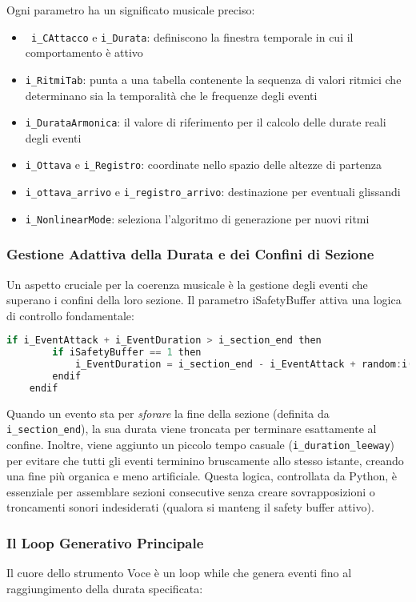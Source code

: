 Ogni parametro ha un significato musicale preciso:

\begin{itemize}
 \item \texttt{ i\_CAttacco}  e \texttt{i\_Durata}: definiscono la finestra temporale in cui il comportamento è attivo
 \item \texttt{i\_RitmiTab}: punta a una tabella contenente la sequenza di valori ritmici che determinano sia la temporalità che le frequenze degli eventi
 \item \texttt{i\_DurataArmonica}: il valore di riferimento per il calcolo delle durate reali degli eventi
 \item \texttt{i\_Ottava} e \texttt{i\_Registro}: coordinate nello spazio delle altezze di partenza
 \item \texttt{i\_ottava\_arrivo} e \texttt{i\_registro\_arrivo}: destinazione per eventuali glissandi
 \item \texttt{i\_NonlinearMode}: seleziona l'algoritmo di generazione per nuovi ritmi
\end{itemize}
\subsubsection{Gestione Adattiva della Durata e dei Confini di Sezione}
Un aspetto cruciale per la coerenza musicale è la gestione degli eventi che superano i confini della loro sezione. Il parametro iSafetyBuffer attiva una logica di controllo fondamentale:

\begin{lstlisting}[language=C]
    if i_EventAttack + i_EventDuration > i_section_end then 
        if iSafetyBuffer == 1 then
            i_EventDuration = i_section_end - i_EventAttack + random:i(0, i_duration_leeway)
        endif
    endif
\end{lstlisting}

Quando un evento sta per \textit{sforare} la fine della sezione (definita da \texttt{i\_section\_end}), la sua durata viene troncata per terminare esattamente al confine. Inoltre, viene aggiunto un piccolo tempo casuale (\texttt{i\_duration\_leeway}) per evitare che tutti gli eventi terminino bruscamente allo stesso istante, creando una fine più organica e meno artificiale. Questa logica, controllata da Python, è essenziale per assemblare sezioni consecutive senza creare sovrapposizioni o troncamenti sonori indesiderati (qualora si manteng il safety buffer attivo).
\subsubsection{Il Loop Generativo Principale}
Il cuore dello strumento Voce è un loop while che genera eventi fino al raggiungimento della durata specificata:

